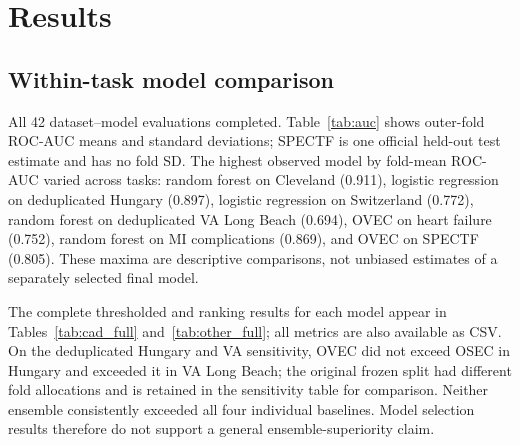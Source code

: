 \documentclass[conference]{IEEEtran}
\begin{document}
\section{Results}
\subsection{Within-task model comparison}
All 42 dataset--model evaluations completed. Table~\ref{tab:auc} shows outer-fold ROC-AUC means and standard deviations; SPECTF is one official held-out test estimate and has no fold SD. The highest observed model by fold-mean ROC-AUC varied across tasks: random forest on Cleveland (0.911), logistic regression on deduplicated Hungary (0.897), logistic regression on Switzerland (0.772), random forest on deduplicated VA Long Beach (0.694), OVEC on heart failure (0.752), random forest on MI complications (0.869), and OVEC on SPECTF (0.805). These maxima are descriptive comparisons, not unbiased estimates of a separately selected final model.

\begin{table}[t]
\centering
\caption{ROC-AUC across all six candidates. Values are fold mean $\pm$ fold SD for nested evaluation. SPECTF reports the single official held-out test estimate.}
\label{tab:auc}
\scriptsize

\end{table}

The complete thresholded and ranking results for each model appear in Tables~\ref{tab:cad_full} and~\ref{tab:other_full}; all metrics are also available as CSV. On the deduplicated Hungary and VA sensitivity, OVEC did not exceed OSEC in Hungary and exceeded it in VA Long Beach; the original frozen split had different fold allocations and is retained in the sensitivity table for comparison. Neither ensemble consistently exceeded all four individual baselines. Model selection results therefore do not support a general ensemble-superiority claim.

\begin{table}[t]
\centering
\caption{Complete classification metrics for the four UCI CAD cohorts. Each value is outer-fold mean $\pm$ SD; PR-AUC should be read alongside cohort prevalence because precision depends on case mix.}
\label{tab:cad_full}
\scriptsize
\setlength{\tabcolsep}{2.2pt}
\resizebox{\textwidth}{!}{}
\end{table}

\begin{table}[t]
\centering
\caption{Complete classification metrics for the task-distinct heart-failure, MI-complication, and SPECTF datasets. SPECTF has one official test split and no fold SD.}
\label{tab:other_full}
\scriptsize
\setlength{\tabcolsep}{2.2pt}
\resizebox{\textwidth}{!}{}
\end{table}
\end{document}
